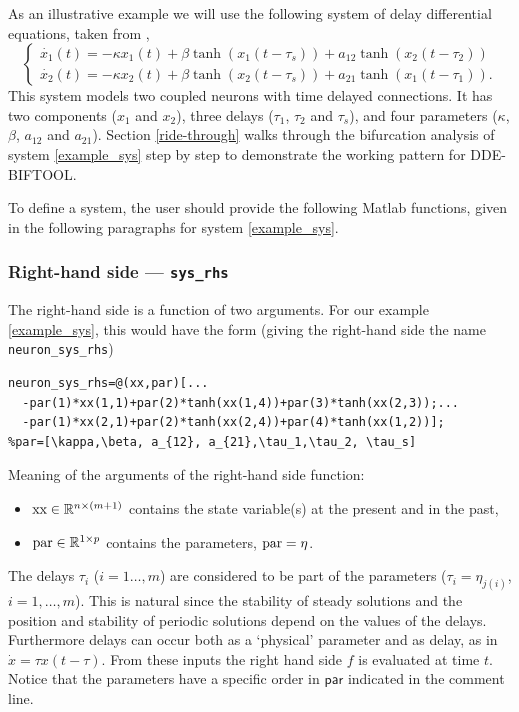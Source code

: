 \documentclass[10pt]{scrartcl}
\newcommand{\DDEBIFCODE}{\textsc{DDE-BIFTOOL}}
\newcommand{\parm}[1]{\mathsf{#1}}
\newcommand{\RR}{\mathbb{R}}
\newcommand{\blist}[1]{\mbox{\lstinline!#1!}}
\begin{document}
As an illustrative example we will use the following system of delay 
differential
equations, taken from \cite{Shay99},
\begin{equation}\label{example_sys}
\left\{
\begin{array}{l}
\dot{x_1}(t)=-\kappa x_1(t)+\beta \tanh(x_1(t-\tau_s))+a_{12}\tanh(x_2(t-\tau_2)) \\
\dot{x_2}(t)=-\kappa x_2(t)+\beta \tanh(x_2(t-\tau_s))+a_{21}\tanh(x_1(t-\tau_1)) .
\end{array}
\right.
\end{equation}
This system models two coupled neurons with time delayed connections.
It has two components ($x_1$ and $x_2$), three delays ($\tau_1$,
$\tau_2$ and $\tau_s$), and four parameters ($\kappa$, $\beta$,
$a_{12}$ and $a_{21}$).  Section \ref{ride-through} walks through the
bifurcation analysis of system \eqref{example_sys} step by step to
demonstrate the working pattern for \DDEBIFCODE.

To define a system, the user should provide the following Matlab
functions, given in the following paragraphs for system \eqref{example_sys}.

\subsubsection{Right-hand side --- \blist{sys_rhs}}\label{sec:constrhs} 
The right-hand side is a function of two arguments. For our example
\eqref{example_sys}, this would have the form (giving the right-hand
side the name \blist{neuron_sys_rhs})
\begin{lstlisting}[frame=lines,label=neuron_sys_rhs,caption={Definition for right-hand side of \eqref{example_sys} as a variable.}]
neuron_sys_rhs=@(xx,par)[...
  -par(1)*xx(1,1)+par(2)*tanh(xx(1,4))+par(3)*tanh(xx(2,3));...
  -par(1)*xx(2,1)+par(2)*tanh(xx(2,4))+par(4)*tanh(xx(1,2))];  
%par=[\kappa,\beta, a_{12}, a_{21},\tau_1,\tau_2, \tau_s]
\end{lstlisting}
Meaning of the arguments of the right-hand side function:
\begin{itemize}
\item $\blist{xx}\in\RR^{n\times (m+1)}$ contains the state
variable(s) at the present and in the past,
\item $\blist{par}\in\RR^{1\times
  p}$ contains the parameters, $\blist{par}=\eta$.
\end{itemize}
The delays $\tau_i$ ($i=1\ldots,m$) are considered to be part of the
parameters ($\tau_i=\eta_{j(i)}$, $i=1,\ldots,m$).  This is natural
since the stability of steady solutions and the position and stability
of periodic solutions depend on the values of the delays.  Furthermore
delays can occur both as a `physical' parameter and as delay, as in
$\dot{x}=\tau x(t-\tau)$.  From these inputs the right hand side $f$
is evaluated at time $t$. Notice that the parameters have a specific
order in $\parm{par}$ indicated in the comment line.
\end{document}

